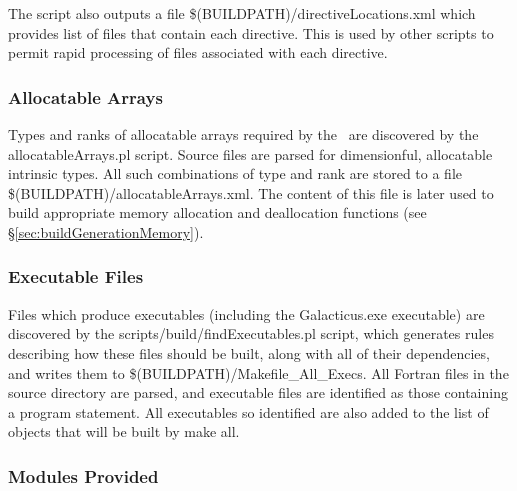 The script also outputs a file {\normalfont \ttfamily \$(BUILDPATH)/directiveLocations.xml} which provides list of files that contain each directive. This is used by other scripts to permit rapid processing of files associated with each directive.

\subsubsection{Allocatable Arrays}\label{sec:buildDiscoverAllocatables}

Types and ranks of allocatable arrays required by the \glc\ are discovered by the {\normalfont \ttfamily allocatableArrays.pl} script. Source files are parsed for dimensionful, allocatable intrinsic types. All such combinations of type and rank are stored to a file {\normalfont \ttfamily \$(BUILDPATH)/allocatableArrays.xml}. The content of this file is later used to build appropriate memory allocation and deallocation functions (see \S\ref{sec:buildGenerationMemory}).

\subsubsection{Executable Files}\label{sec:buildExecutables}

Files which produce executables (including the {\normalfont \ttfamily Galacticus.exe} executable) are discovered by the {\normalfont \ttfamily scripts/build/findExecutables.pl} script, which generates rules describing how these files should be built, along with all of their dependencies, and writes them to {\normalfont \ttfamily \$(BUILDPATH)/Makefile\_All\_Execs}. All Fortran files in the {\normalfont \ttfamily source} directory are parsed, and executable files are identified as those containing a {\normalfont \ttfamily program} statement. All executables so identified are also added to the list of objects that will be built by {\normalfont \ttfamily make all}.

\subsubsection{Modules Provided}\label{sec:buildModulesProvided}


